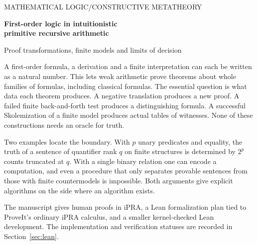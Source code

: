 \documentclass[11pt,letterpaper]{article}
\theoremstyle{packet}
\theoremstyle{definition}\newtheorem{definition}[theorem]{Definition}\newtheorem{example}[theorem]{Example}
\begin{document}
\thispagestyle{plain}
{\noindent\sffamily\small\color{accent}MATHEMATICAL LOGIC\quad /\quad CONSTRUCTIVE METATHEORY\par}
\vspace{1.15em}
{\raggedright\noindent\color{ink}\huge\bfseries First-order logic in intuitionistic\\primitive recursive arithmetic\par}
\vspace{.6em}
{\noindent\large Proof transformations, finite models and limits of decision\par}
\vspace{1.2em}
\noindent A first-order formula, a derivation and a finite interpretation can each be written as a natural number. This lets weak arithmetic prove theorems about whole families of formulas, including classical formulas. The essential question is what data each theorem produces. A negative translation produces a new proof. A failed finite back-and-forth test produces a distinguishing formula. A successful Skolemization of a finite model produces actual tables of witnesses. None of these constructions needs an oracle for truth.
\medskip

\noindent Two examples locate the boundary. With $p$ unary predicates and equality, the truth of a sentence of quantifier rank $q$ on finite structures is determined by $2^p$ counts truncated at $q$. With a single binary relation one can encode a computation, and even a procedure that only separates provable sentences from those with finite countermodels is impossible. Both arguments give explicit algorithms on the side where an algorithm exists.
\medskip

\noindent The manuscript gives human proofs in iPRA, a Lean formalization plan tied to ProveIt's ordinary iPRA calculus, and a smaller kernel-checked Lean development. The implementation and verification statuses are recorded in Section~\ref{sec:lean}.
\tableofcontents\clearpage












\end{document}
